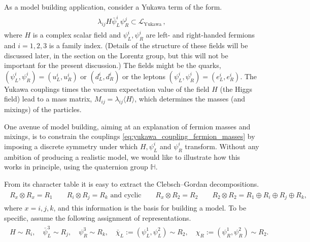 \begin{mytheorem}
As a model building application, consider a Yukawa term of the form.
\begin{align}\label{eq:yukawa_coupling_fermion_masses}
\begin{aligned}
    \lambda_{i j} H \bar{\psi}_{L}^{i} \psi_{R}^{j} \subset \mathcal{L}_{\text{Yukawa}} \, ,
\end{aligned}
\end{align}
where $H$ is a complex scalar field and $\psi_{L}^{i}, \psi_{R}^{i}$ are left- and right-handed fermions and $i=1,2,3$ is a family index.
(Details of the structure of these fields will be discussed later, in the section on the Lorentz group, but this will not be important for the present discussion.)
The fields might be the quarks, $\left(\psi_{L}^{i}, \psi_{R}^{i}\right)=\left(u_{L}^{i}, u_{R}^{i}\right)$ or $\left(d_{L}^{i}, d_{R}^{i}\right)$ or the leptons $\left(\psi_{L}^{i}, \psi_{R}^{i}\right)=\left(e_{L}^{i}, e_{R}^{i}\right)$.
The Yukawa couplings times the vacuum expectation value of the field $H$ (the Higgs field) lead to a mass matrix, $M_{i j}=\lambda_{i j}\langle H\rangle$, which determines the masses (and mixings) of the particles.

One avenue of model building, aiming at an explanation of fermion masses and mixings, is to constrain the couplings \eqref{eq:yukawa_coupling_fermion_masses} by imposing a discrete symmetry under which $H, \psi_{L}^{i}$ and $\psi_{R}^{i}$ transform.
Without any ambition of producing a realistic model, we would like to illustrate how this works in principle, using the quaternion group $\mathbb{H}$.

From its character table it is easy to extract the Clebsch--Gordan decompositions.
\begin{align}
\begin{aligned}
    R_{x} \otimes R_{x}=R_{1}
    \qquad
    R_{i} \otimes R_{j}=R_{k} \text{ and cyclic}
    \qquad
    R_{x} \otimes R_{2}=R_{2}
    \qquad
    R_{2} \otimes R_{2}=R_{1} \oplus R_{i} \oplus R_{j} \oplus R_{k} ,
\end{aligned}
\end{align}
where $x=i,j,k$, and this information is the basis for building a model.
To be specific, assume the following assignment of representations.
\begin{align}
\begin{aligned}
    H \sim R_{i}, \quad \bar{\psi}_{L}^{3} \sim R_{j}, \quad \psi_{R}^{3} \sim R_{k}, \quad \bar{\chi}_{L}:=\left(\psi_{L}^{1}, \psi_{L}^{2}\right) \sim R_{2}, \quad \chi_{R}:=\left(\psi_{R}^{1}, \psi_{R}^{2}\right) \sim R_{2} .
\end{aligned}
\end{align}


\end{mytheorem}
